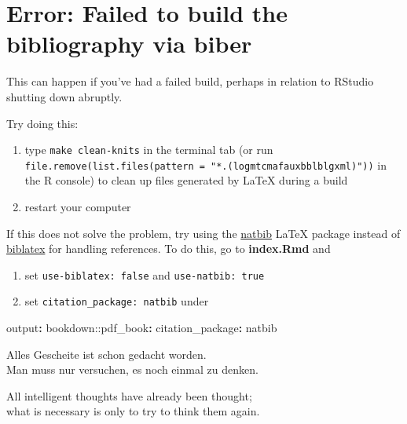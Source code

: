 \documentclass[a4paper, nobind]{templates/ociamthesis}
\providecommand{\tightlist}{%
  \setlength{\itemsep}{0pt}\setlength{\parskip}{0pt}}
\newenvironment{Shaded}{\begin{snugshade}}{\end{snugshade}}
\newcommand{\AttributeTok}[1]{\textcolor[rgb]{0.77,0.63,0.00}{#1}}
\newcommand{\FunctionTok}[1]{\textcolor[rgb]{0.00,0.00,0.00}{#1}}
\newcommand{\KeywordTok}[1]{\textcolor[rgb]{0.13,0.29,0.53}{\textbf{#1}}}
\renewenvironment{Shaded}
{
  \vspace{10pt}%
  \begin{snugshade}%
}{%
  \end{snugshade}%
  \vspace{8pt}%
}
\begin{document}
\hypertarget{error-failed-to-build-the-bibliography-via-biber}{%
\section{Error: Failed to build the bibliography via biber}\label{error-failed-to-build-the-bibliography-via-biber}}

This can happen if you've had a failed build, perhaps in relation to RStudio shutting down abruptly.

Try doing this:

\begin{enumerate}
\def\labelenumi{\arabic{enumi}.}
\tightlist
\item
  type \texttt{make\ clean-knits} in the terminal tab (or run \texttt{file.remove(list.files(pattern\ =\ "*.(log\textbar{}mtc\textbar{}maf\textbar{}aux\textbar{}bbl\textbar{}blg\textbar{}xml)"))} in the R console) to clean up files generated by LaTeX during a build
\item
  restart your computer
\end{enumerate}

If this does not solve the problem, try using the \href{https://www.overleaf.com/learn/latex/Bibliography_management_with_natbib}{natbib} LaTeX package instead of \href{https://www.overleaf.com/learn/latex/Articles/Getting_started_with_BibLaTeX}{biblatex} for handling references.
To do this, go to \textbf{index.Rmd} and

\begin{enumerate}
\def\labelenumi{\arabic{enumi}.}
\tightlist
\item
  set \texttt{use-biblatex:\ false} and \texttt{use-natbib:\ true}
\item
  set \texttt{citation\_package:\ natbib} under
\end{enumerate}

\begin{Shaded}
\begin{Highlighting}[]
\FunctionTok{output}\KeywordTok{:}
\AttributeTok{  bookdown:}\FunctionTok{:pdf\_book}\KeywordTok{:}
\AttributeTok{    }\FunctionTok{citation\_package}\KeywordTok{:}\AttributeTok{ natbib}
\end{Highlighting}
\end{Shaded}

\begin{savequote}
Alles Gescheite ist schon gedacht worden.\\
Man muss nur versuchen, es noch einmal zu denken.

All intelligent thoughts have already been thought;\\
what is necessary is only to try to think them again.
\end{savequote}
\end{document}
